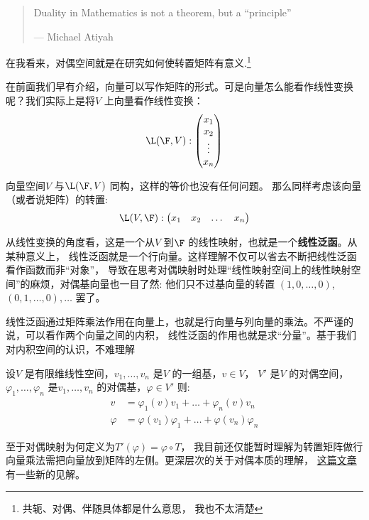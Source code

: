 \begin{quote}
  Duality in Mathematics is not a theorem, but a ``principle''

  \hfill --- Michael Atiyah
\end{quote}

在我看来，对偶空间就是在研究如何使转置矩阵有意义.\footnote{共轭、对偶、伴随具体都是什么意思，
我也不太清楚}

在前面我们早有介绍，向量可以写作矩阵的形式。可是向量怎么能看作线性变换呢？我们实际上是将\(V\)
上向量看作线性变换：\[
  \L(\F,V):
  \begin{pmatrix}
    x_1 \\
    x_2 \\
    \vdots \\
    x_n
  \end{pmatrix}
\]

向量空间\(V\) 与\(\L(\F,V)\) 同构，这样的等价也没有任何问题。
那么同样考虑该向量（或者说矩阵）的转置:
\[
  \L(V,\F):
  \begin{pmatrix}
    x_1 & x_2 & \dots & x_n
  \end{pmatrix}
\]

从线性变换的角度看，这是一个从\(V\) 到\(\F\) 的线性映射，也就是一个\textbf{线性泛函}。从某种意义上，
线性泛函就是一个行向量。这样理解不仅可以省去不断把线性泛函看作函数而非``对象''，
导致在思考对偶映射时处理``线性映射空间上的线性映射空间''的麻烦，对偶基向量也一目了然:
他们只不过基向量的转置 \((1,0,\dots ,0)\),\((0,1,\dots ,0),\dots \) 罢了。

线性泛函通过矩阵乘法作用在向量上，也就是行向量与列向量的乘法。不严谨的说，可以看作两个向量之间的内积，
线性泛函的作用也就是求``分量''。基于我们对内积空间的认识，不难理解
\begin{theorem}
  设\(V\) 是有限维线性空间，\(v_{1}, \dots ,v_{n}\) 是\(V\) 的一组基，\(v \in V\)，
  \(V'\) 是\(V\) 的对偶空间，\(\varphi_{1}, \dots ,\varphi_{n}\)
  是\(v_{1}, \dots ,v_{n}\) 的对偶基，\(\varphi \in V'\)
  则:
  \begin{align*}
    v &= \varphi_{1}(v)v_{1} + \dots + \varphi_{n}(v)v_{n} \\
    \varphi &= \varphi(v_{1})\varphi_{1} + \dots +
    \varphi(v_{n})\varphi_{n}
  \end{align*}
\end{theorem}

至于对偶映射为何定义为\(T'(\varphi)=\varphi \circ T\)，
我目前还仅能暂时理解为转置矩阵做行向量乘法需把向量放到矩阵的左侧。更深层次的关于对偶本质的理解，
\href{https://www.zhihu.com/question/38464481/answer/2110009942}{这篇文章}有一些新的见解。
